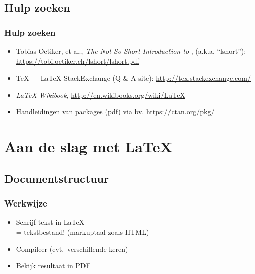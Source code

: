 \documentclass[aspectratio=169]{beamer}
\begin{document}
\subsection{Hulp zoeken}

\begin{frame}
  \frametitle{Hulp zoeken}

  \begin{itemize}
    \item Tobias Oetiker, et al., \emph{The Not So Short Introduction to {\LaTeXe}}, (a.k.a. ``lshort''):
    \url{https://tobi.oetiker.ch/lshort/lshort.pdf}
    \item {\TeX} --- {\LaTeX} StackExchange (Q \& A site): \url{http://tex.stackexchange.com/}
    \item \emph{{\LaTeX} Wikibook}, \url{http://en.wikibooks.org/wiki/LaTeX}
    \item Handleidingen van packages (pdf) via bv. \url{https://ctan.org/pkg/}
  \end{itemize}

\end{frame}

\section{Aan de slag met {\LaTeX}}

\subsection{Documentstructuur}

\begin{frame}
  \frametitle{Werkwijze}

  \begin{itemize}
    \item<+-> Schrijf tekst in {\LaTeX}\\
    = tekstbestand! (markuptaal zoals HTML)
    \item<+-> Compileer (evt.\ verschillende keren)
    \item<+-> Bekijk resultaat in PDF
  \end{itemize}
\end{frame}
\end{document}
